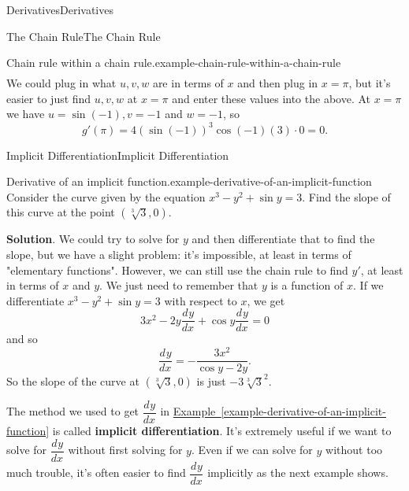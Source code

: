 \documentclass[10pt,]{book}
\newcommand{\terminology}[1]{\textbf{#1}}
\numberwithin{equation}{section}
\newcommand{\dv}[3][]{\dfrac{d^{#1} #2}{d #3^{#1}}}
\begin{document}
\begin{chapterptx}{Derivatives}{}{Derivatives}{}{}
\begin{sectionptx}{The Chain Rule}{}{The Chain Rule}{}{}
\begin{example}{Chain rule within a chain rule.}{example-chain-rule-within-a-chain-rule}
\begin{align*}
\end{align*}
We could plug in what \(u,v,w\) are in terms of \(x\) and then plug in \(x=\pi\), but it's easier to just find \(u,v,w\) at \(x=\pi\) and enter these values into the above. At \(x=\pi\) we have \(u = \sin(-1), v = -1\) and \(w = -1\), so%
\begin{equation*}
g'(\pi) = 4(\sin(-1))^{3}\cos(-1)(3)\cdot0 = 0.
\end{equation*}
%
\end{example}
\end{sectionptx}
%
%
\typeout{************************************************}
\typeout{************************************************}
%
\begin{sectionptx}{Implicit Differentiation}{}{Implicit Differentiation}{}{}\label{section-implicit-differentiation}
\begin{example}{Derivative of an implicit function.}{example-derivative-of-an-implicit-function}%
\hypertarget{p-158}{}%
Consider the curve given by the equation \(x^{3} - y^{2} + \sin y = 3\). Find the slope of this curve at the point \((\sqrt[3]{3},0)\).%
\par\smallskip%
\noindent\textbf{Solution}.\hypertarget{solution-33}{}\quad%
\hypertarget{p-159}{}%
We could try to solve for \(y\) and then differentiate that to find the slope, but we have a slight problem: it's impossible, at least in terms of "elementary functions". However, we can still use the chain rule to find \(y'\), at least in terms of \(x\) and \(y\). We just need to remember that \(y\) is a function of \(x\). If we differentiate \(x^{3} - y^{2} + \sin y = 3\) with respect to \(x\), we get%
\begin{equation*}
3x^{2} - 2y\dv{y}{x} + \cos y \dv{y}{x} = 0
\end{equation*}
and so%
\begin{equation*}
\dv{y}{x} = -\frac{3x^{2}}{\cos y - 2y}.
\end{equation*}
So the slope of the curve at \((\sqrt[3]{3},0)\) is just \(-3\sqrt[3]{3}^{2}\).%
\end{example}
\hypertarget{p-160}{}%
The method we used to get \(\dv{y}{x}\) in \hyperref[example-derivative-of-an-implicit-function]{Example~\ref{example-derivative-of-an-implicit-function}} is called \terminology{implicit differentiation}. It's extremely useful if we want to solve for \(\dv{y}{x}\) without first solving for \(y\). Even if we can solve for \(y\) without too much trouble, it's often easier to find \(\dv{y}{x}\) implicitly as the next example shows.%

\end{sectionptx}
\end{chapterptx}
\end{document}
